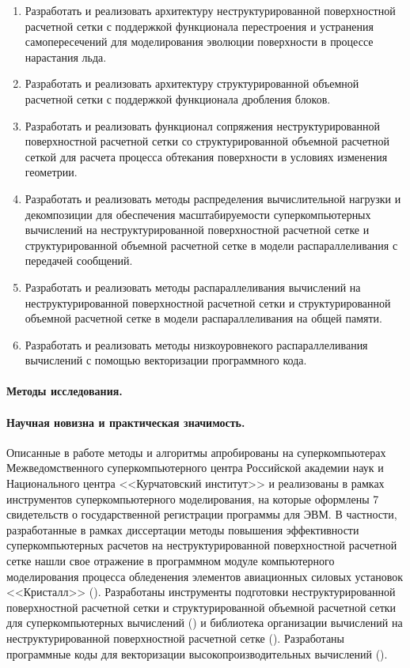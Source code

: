 \documentclass[a4paper,14pt]{extarticle}                     %
\numberwithin{equation}{section}                             %
\numberwithin{figure}{section}                               %
\numberwithin{table}{section}                                %
\theoremstyle{plain}                                         %
\numberwithin{theorem}{section}                              %
\numberwithin{lemma}{section}                                %
\numberwithin{definition}{section}                           %
\begin{document}
\begin{enumerate}
\item Разработать и реализовать архитектуру неструктурированной поверхностной расчетной сетки с поддержкой функционала перестроения и устранения самопересечений для моделирования эволюции поверхности в процессе нарастания льда.
\item Разработать и реализовать архитектуру структурированной объемной расчетной сетки с поддержкой функционала дробления блоков. 
\item Разработать и реализовать функционал сопряжения неструктурированной поверхностной расчетной сетки со структурированной объемной расчетной сеткой для расчета процесса обтекания поверхности в условиях изменения геометрии.
\item Разработать и реализовать методы распределения вычислительной нагрузки и декомпозиции для обеспечения масштабируемости суперкомпьютерных вычислений на неструктурированной поверхностной расчетной сетке и структурированной объемной расчетной сетке в модели распараллеливания с передачей сообщений.
\item Разработать и реализовать методы распараллеливания вычислений на неструктурированной поверхностной расчетной сетки и структурированной объемной расчетной сетке в модели распараллеливания на общей памяти.
\item Разработать и реализовать методы низкоуровнекого распараллеливания вычислений с помощью векторизации программного кода.
\end{enumerate}

\paragraph{Методы исследования.}

\paragraph{Научная новизна и практическая значимость.}

Описанные в работе методы и алгоритмы апробированы на суперкомпьютерах Межведомственного суперкомпьютерного центра Российской академии наук и Национального центра <<Курчатовский институт>> и реализованы в рамках инструментов суперкомпьютерного моделирования, на которые оформлены 7 свидетельств о государственной регистрации программы для ЭВМ.
В частности, разработанные в рамках диссертации методы повышения эффективности суперкомпьютерных расчетов на неструктурированной поверхностной расчетной сетке нашли свое отражение в программном модуле компьютерного моделирования процесса обледенения элементов авиационных силовых установок <<Кристалл>> (\cite{CertGoryachev2023Crys,CertGoryachev2020Crys}).
Разработаны инструменты подготовки неструктурированной поверхностной расчетной сетки и структурированной объемной расчетной сетки для суперкомпьютерных вычислений (\cite{CertRybakov2021PrepUnstruct,CertRybakov2020PrepStruct}) и библиотека организации вычислений на неструктурированной поверхностной расчетной сетке (\cite{CertRybakov2024Surf}).
Разработаны программные коды для векторизации высокопроизводительных вычислений (\cite{CertRybakov2019AVX,CertRybakov2023Mon}).
\end{document}
